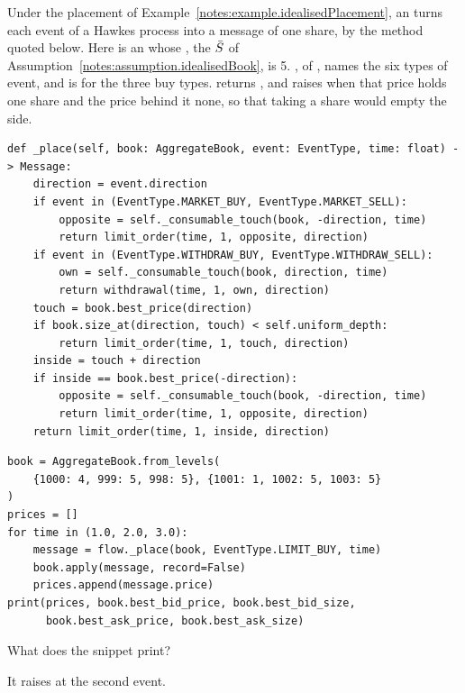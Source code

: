 \begin{question}
\label{question.idealisedLimitBuyAtAFullTouch}
Under the placement of Example~\ref{notes:example.idealisedPlacement},
an  turns each event of a Hawkes process into a message of one share,
by the method quoted below.
Here  is an  whose ,
the $\bar{S}$ of Assumption~\ref{notes:assumption.idealisedBook}, is 5.
, of , names the six types of event,
and  is  for the three buy types.
 returns ,
and raises  when that price holds one share and the price behind it none,
so that taking a share would empty the side.
\begin{lstlisting}[caption={\protect\codehl{unito26.lob.idealised.IdealisedFlow.\_place}}, label=listing.idealisedLimitBuyAtAFullTouchPlace]
def _place(self, book: AggregateBook, event: EventType, time: float) -> Message:
    direction = event.direction
    if event in (EventType.MARKET_BUY, EventType.MARKET_SELL):
        opposite = self._consumable_touch(book, -direction, time)
        return limit_order(time, 1, opposite, direction)
    if event in (EventType.WITHDRAW_BUY, EventType.WITHDRAW_SELL):
        own = self._consumable_touch(book, direction, time)
        return withdrawal(time, 1, own, direction)
    touch = book.best_price(direction)
    if book.size_at(direction, touch) < self.uniform_depth:
        return limit_order(time, 1, touch, direction)
    inside = touch + direction
    if inside == book.best_price(-direction):
        opposite = self._consumable_touch(book, -direction, time)
        return limit_order(time, 1, opposite, direction)
    return limit_order(time, 1, inside, direction)
\end{lstlisting}
\begin{lstlisting}[caption={Three limit buys}, label=listing.idealisedLimitBuyAtAFullTouchRun]
book = AggregateBook.from_levels(
    {1000: 4, 999: 5, 998: 5}, {1001: 1, 1002: 5, 1003: 5}
)
prices = []
for time in (1.0, 2.0, 3.0):
    message = flow._place(book, EventType.LIMIT_BUY, time)
    book.apply(message, record=False)
    prices.append(message.price)
print(prices, book.best_bid_price, book.best_bid_size,
      book.best_ask_price, book.best_ask_size)
\end{lstlisting}
What does the snippet print?
\begin{choices}
 \choice {}
 \correctchoice {}
 \choice {}
 \choice It raises  at the second event.
\end{choices}
\end{question}
